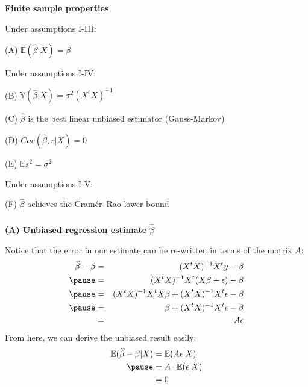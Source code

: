 \begin{frame}[fragile] \frametitle{}

{\bf Finite sample properties}

Under assumptions I-III:

\hspace{1cm} (A) $\mathbb{E} (\widehat{\beta} | X) = \beta$ \pause

Under assumptions I-IV:

\hspace{1cm}  (B)  $\mathbb{V} (\widehat{\beta} | X) = \sigma^2 (X^t X)^{-1}$ \pause

\hspace{1cm}  (C) $\widehat{\beta}$ is the best linear unbiased estimator (Gauss-Markov) \pause

\hspace{1cm}  (D) $Cov( \widehat{\beta}, r | X) = 0$ \pause

\hspace{1cm}  (E) $\mathbb{E} s^2 = \sigma^2$ \pause

Under assumptions I-V:

\hspace{1cm}  (F) $\widehat{\beta}$ achieves the Cramér–Rao lower bound

\end{frame}

\begin{frame}[fragile] \frametitle{}

{\bf (A) Unbiased regression estimate $\widehat{\beta}$}

Notice that the error in our estimate can be re-written in terms of
the matrix $A$:
\begin{eqnarray*}
\widehat{\beta}  - \beta &=& (X^t X)^{-1} X^t y - \beta \\ \pause
&=& (X^t X)^{-1} X^t (X\beta + \epsilon) - \beta \\ \pause
&=& (X^t X)^{-1} X^t X \beta + (X^t X)^{-1} X^t \epsilon - \beta \\ \pause
&=& \beta + (X^t X)^{-1} X^t \epsilon - \beta \\
&=& A \epsilon
\end{eqnarray*}
\pause From here, we can derive the unbiased result easily:
\begin{align*}
\mathbb{E} (\widehat{\beta}  - \beta | X) &= \mathbb{E} (A \epsilon | X) \\ \pause
&= A \cdot \mathbb{E} (\epsilon | X) \\
&= 0
\end{align*}

\end{frame}

